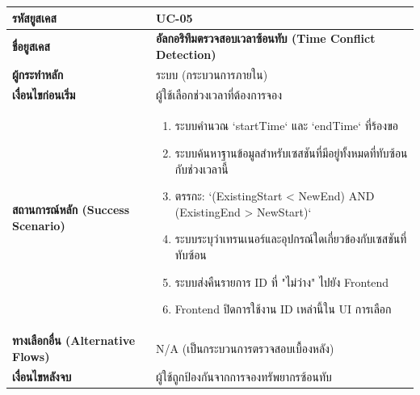 \begin{longtable}{|p{3cm}|p{12cm}|}
\hline
\textbf{รหัสยูสเคส} & UC-05 \\ \hline
\textbf{ชื่อยูสเคส} & \textbf{อัลกอริทึมตรวจสอบเวลาซ้อนทับ (Time Conflict Detection)} \\ \hline
\textbf{ผู้กระทำหลัก} & ระบบ (กระบวนการภายใน) \\ \hline
\textbf{เงื่อนไขก่อนเริ่ม} & ผู้ใช้เลือกช่วงเวลาที่ต้องการจอง \\ \hline
\textbf{สถานการณ์หลัก (Success Scenario)} & 
\begin{enumerate}
    \item ระบบคำนวณ `startTime` และ `endTime` ที่ร้องขอ
    \item ระบบค้นหาฐานข้อมูลสำหรับเซสชันที่มีอยู่ทั้งหมดที่ทับซ้อนกับช่วงเวลานี้
    \item ตรรกะ: `(ExistingStart < NewEnd) AND (ExistingEnd > NewStart)`
    \item ระบบระบุว่าเทรนเนอร์และอุปกรณ์ใดเกี่ยวข้องกับเซสชันที่ทับซ้อน
    \item ระบบส่งคืนรายการ ID ที่ "ไม่ว่าง" ไปยัง Frontend
    \item Frontend ปิดการใช้งาน ID เหล่านี้ใน UI การเลือก
\end{enumerate} \\ \hline
\textbf{ทางเลือกอื่น (Alternative Flows)} & N/A (เป็นกระบวนการตรวจสอบเบื้องหลัง) \\ \hline
\textbf{เงื่อนไขหลังจบ} & ผู้ใช้ถูกป้องกันจากการจองทรัพยากรซ้อนทับ \\ \hline
\end{longtable}

